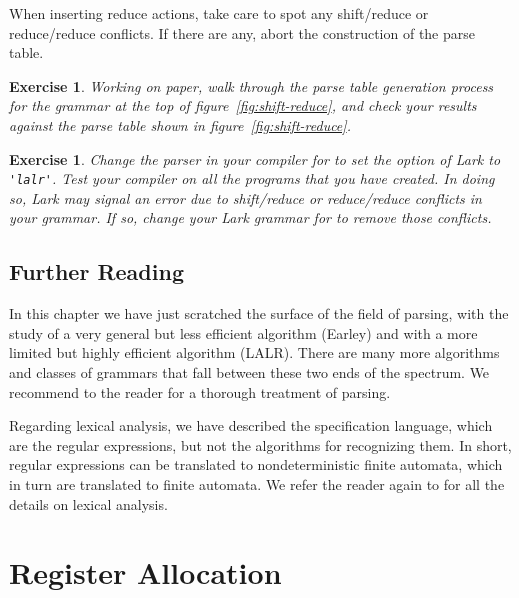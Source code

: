 \documentclass[7x10]{TimesAPriori_MIT}%
\newtheorem{exercise}[theorem]{Exercise}
\numberwithin{theorem}{chapter}
\numberwithin{definition}{chapter}
\numberwithin{equation}{chapter}
\begin{document}
{When inserting reduce actions, take care to spot any shift/reduce or
reduce/reduce conflicts. If there are any, abort the construction of
the parse table.


\begin{exercise}
  \normalfont\normalsize
%
Working on paper, walk through the parse table generation process for
the grammar at the top of figure~\ref{fig:shift-reduce}, and check
your results against the parse table shown in
figure~\ref{fig:shift-reduce}.
\end{exercise}


\begin{exercise}
  \normalfont\normalsize
%
  Change the parser in your compiler for \LangVar{} to set the
   option of Lark to \lstinline{'lalr'}. Test your compiler on
  all the \LangVar{} programs that you have created. In doing so, Lark
  may signal an error due to shift/reduce or reduce/reduce conflicts
  in your grammar. If so, change your Lark grammar for \LangVar{} to
  remove those conflicts.
\end{exercise}


\section{Further Reading}

In this chapter we have just scratched the surface of the field of
parsing, with the study of a very general but less efficient algorithm
(Earley) and with a more limited but highly efficient algorithm
(LALR). There are many more algorithms and classes of grammars that
fall between these two ends of the spectrum. We recommend to the reader
\citet{Aho:2006wb} for a thorough treatment of parsing.

Regarding lexical analysis, we have described the specification
language, which are the regular expressions, but not the algorithms
for recognizing them. In short, regular expressions can be translated
to nondeterministic finite automata, which in turn are translated to
finite automata.  We refer the reader again to \citet{Aho:2006wb} for
all the details on lexical analysis.

\fi}

\chapter{Register Allocation}
\label{ch:register-allocation-Lvar}
\setcounter{footnote}{0}
\end{document}
